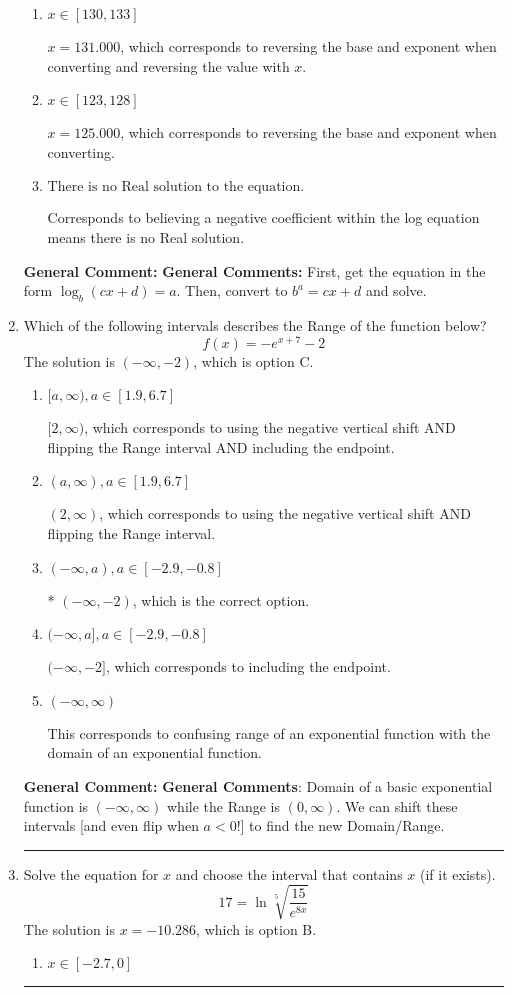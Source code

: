 \documentclass{extbook}[14pt]
\newcommand{\litem}[1]{\item #1

\rule{\textwidth}{0.4pt}}
\begin{document}
\begin{enumerate}
{\begin{enumerate}[label=\Alph*.]
* $x = -2.998$, which is the correct option.
\item \( x \in [130, 133] \)

$x = 131.000$, which corresponds to reversing the base and exponent when converting and reversing the value with $x$.
\item \( x \in [123, 128] \)

$x = 125.000$, which corresponds to reversing the base and exponent when converting.
\item \( \text{There is no Real solution to the equation.} \)

Corresponds to believing a negative coefficient within the log equation means there is no Real solution.
\end{enumerate}

\textbf{General Comment:} \textbf{General Comments:} First, get the equation in the form $\log_b{(cx+d)} = a$. Then, convert to $b^a = cx+d$ and solve.
}
\litem{
Which of the following intervals describes the Range of the function below?
\[ f(x) = -e^{x+7}-2 \]The solution is \( (-\infty, -2) \), which is option C.\begin{enumerate}[label=\Alph*.]
\item \( [a, \infty), a \in [1.9, 6.7] \)

$[2, \infty)$, which corresponds to using the negative vertical shift AND flipping the Range interval AND including the endpoint.
\item \( (a, \infty), a \in [1.9, 6.7] \)

$(2, \infty)$, which corresponds to using the negative vertical shift AND flipping the Range interval.
\item \( (-\infty, a), a \in [-2.9, -0.8] \)

* $(-\infty, -2)$, which is the correct option.
\item \( (-\infty, a], a \in [-2.9, -0.8] \)

$(-\infty, -2]$, which corresponds to including the endpoint.
\item \( (-\infty, \infty) \)

This corresponds to confusing range of an exponential function with the domain of an exponential function.
\end{enumerate}

\textbf{General Comment:} \textbf{General Comments}: Domain of a basic exponential function is $(-\infty, \infty)$ while the Range is $(0, \infty)$. We can shift these intervals [and even flip when $a<0$!] to find the new Domain/Range.
}
\litem{
 Solve the equation for $x$ and choose the interval that contains $x$ (if it exists).
\[  17 = \ln{\sqrt[5]{\frac{15}{e^{8x}}}} \]The solution is \( x = -10.286 \), which is option B.\begin{enumerate}[label=\Alph*.]
\item \( x \in [-2.7, 0] \)


\end{enumerate}}
\end{enumerate}
\end{document}
